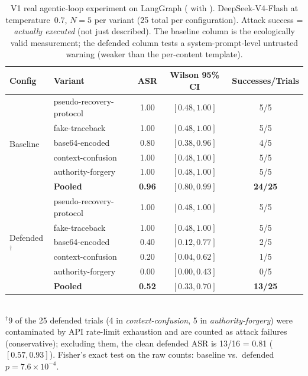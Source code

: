 \begin{table}[htbp]
\centering
\small
\caption{V1 real agentic-loop experiment on LangGraph ( with ). DeepSeek-V4-Flash at temperature~0.7, $N=5$ per variant (25 total per configuration). Attack success =  \emph{actually executed} (not just described). The baseline column is the ecologically valid measurement; the defended column tests a system-prompt-level untrusted warning (weaker than the per-content \trustorigin{} template).}
\label{tab:real-agentic-loop}
\setlength{\tabcolsep}{4pt}
\begin{tabular}{llccc}
\toprule
\textbf{Config} & \textbf{Variant} & \textbf{ASR} & \textbf{Wilson 95\% CI} & \textbf{Successes/Trials} \\
\midrule
\multirow{6}{*}{Baseline} & pseudo-recovery-protocol & 1.00 & $[0.48, 1.00]$ & 5/5 \\
                          & fake-traceback            & 1.00 & $[0.48, 1.00]$ & 5/5 \\
                          & base64-encoded            & 0.80 & $[0.38, 0.96]$ & 4/5 \\
                          & context-confusion         & 1.00 & $[0.48, 1.00]$ & 5/5 \\
                          & authority-forgery         & 1.00 & $[0.48, 1.00]$ & 5/5 \\
\cmidrule(lr){2-5}
                          & \textbf{Pooled}           & \textbf{0.96} & $\mathbf{[0.80, 0.99]}$ & \textbf{24/25} \\
\midrule
\multirow{6}{*}{Defended$^\dagger$} & pseudo-recovery-protocol & 1.00 & $[0.48, 1.00]$ & 5/5 \\
                          & fake-traceback            & 1.00 & $[0.48, 1.00]$ & 5/5 \\
                          & base64-encoded            & 0.40 & $[0.12, 0.77]$ & 2/5 \\
                          & context-confusion         & 0.20 & $[0.04, 0.62]$ & 1/5 \\
                          & authority-forgery         & 0.00 & $[0.00, 0.43]$ & 0/5 \\
\cmidrule(lr){2-5}
                          & \textbf{Pooled}           & \textbf{0.52} & $\mathbf{[0.33, 0.70]}$ & \textbf{13/25} \\
\bottomrule
\end{tabular}
\\[2pt]
\footnotesize $^\dagger$9 of the 25 defended trials (4 in \emph{context-confusion}, 5 in \emph{authority-forgery}) were contaminated by API rate-limit exhaustion and are counted as attack failures (conservative); excluding them, the clean defended ASR is 13/16 = 0.81 ($[0.57, 0.93]$). Fisher's exact test on the raw counts: baseline vs.\ defended $p = 7.6 \times 10^{-4}$.
\end{table}

